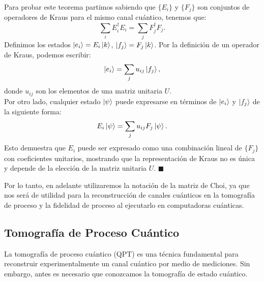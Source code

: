 \documentclass[letterpaper,12pt]{thesisECFM}
\theoremstyle{plain}
\theoremstyle{definition}
\theoremstyle{definition}
\theoremstyle{remark}
\newcommand{\1}{\mathbb{1}}
\begin{document}
Para probar este teorema partimos sabiendo que  $\{E_i\}$ y $\{F_j\}$ son conjuntos de operadores de Kraus para el mismo canal cuántico, tenemos que:
\begin{equation}
   \sum_i E_i^\dagger E_i = \sum_j F_j^\dagger F_j. 
\end{equation}
Definimos los estados $\ket{e_i} = E_i \ket{k}$, $\ket{f_j} = F_j \ket{k}$. Por la definición de un operador de Kraus, podemos escribir:
\begin{equation}
  \ket{e_i} = \sum_j u_{ij} \ket{f_j},  
\end{equation} 
donde $u_{ij}$ son los elementos de una matriz unitaria $U$.\\
Por otro lado, cualquier estado $\ket{\psi}$ puede expresarse en términos de $\ket{e_i}$ y $\ket{f_j}$ de la siguiente forma:
\begin{equation}
E_i \ket{\psi} = \sum_j u_{ij} F_j \ket{\psi}.
\end{equation}
Esto demuestra que $E_i$ puede ser expresado como una combinación lineal de $\{F_j\}$ con coeficientes unitarios, mostrando que la representación de Kraus no es única y depende de la elección de la matriz unitaria $U$. $\blacksquare$

Por lo tanto, en adelante utilizaremos la notación de la matriz de Choi, ya que nos será de utilidad para la reconstrucción de canales cuánticos en la tomografía de proceso y la fidelidad de proceso al ejecutarlo en computadoras cuánticas.



\subsection{Tomografía de Proceso Cuántico} %
\label{sec:Tomo_proc}
La tomografía de proceso cuántico (QPT) es una técnica fundamental para reconstruir experimentalmente un canal cuántico por medio de mediciones. Sin embargo, antes es necesario que conozcamos la tomografía de estado cuántico.  
\end{document}
